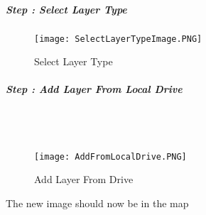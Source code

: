 \subparagraph*{{\LARGE Step \thestepCount :} Select Layer Type}
\vspace{.75in}

\vspace{.5in}
%
%
\begin{figure}[h!]
\centering
    \texttt{[image: SelectLayerTypeImage.PNG]}
\caption{Select Layer Type}
\end{figure}
\clearpage
%
%
%


\subparagraph*{{\LARGE Step \thestepCount :} Add Layer From Local Drive}
\vspace{.75in}

\\

\noindent {}\\
\noindent{}

\vspace{.3in}

%
%
\begin{figure}[h!]
\centering
    \texttt{[image: AddFromLocalDrive.PNG]}
\caption{Add Layer From Drive}
\end{figure}
{\Large The new image should now be in the map}
\clearpage

